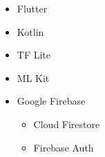 \begin{itemize}
    \item Flutter
    \item Kotlin
    \item TF Lite
    \item ML Kit
    \item Google Firebase
        \begin{itemize}
        \item Cloud Firestore
        \item Firebase Auth
        \end{itemize}
\end{itemize}